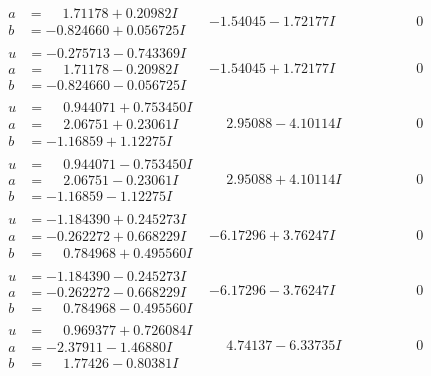 \documentclass[1p]{elsarticle_modified}
\theoremstyle{definition}
\begin{document}
$$\begin{array}{c|c|c}
\begin{aligned}
a &= \phantom{-}1.71178 + 0.20982 I \\
b &= -0.824660 + 0.056725 I\end{aligned}
 & -1.54045 - 1.72177 I & \phantom{-0.000000 } 0 \\ \hline\begin{aligned}
u &= -0.275713 - 0.743369 I \\
a &= \phantom{-}1.71178 - 0.20982 I \\
b &= -0.824660 - 0.056725 I\end{aligned}
 & -1.54045 + 1.72177 I & \phantom{-0.000000 } 0 \\ \hline\begin{aligned}
u &= \phantom{-}0.944071 + 0.753450 I \\
a &= \phantom{-}2.06751 + 0.23061 I \\
b &= -1.16859 + 1.12275 I\end{aligned}
 & \phantom{-}2.95088 - 4.10114 I & \phantom{-0.000000 } 0 \\ \hline\begin{aligned}
u &= \phantom{-}0.944071 - 0.753450 I \\
a &= \phantom{-}2.06751 - 0.23061 I \\
b &= -1.16859 - 1.12275 I\end{aligned}
 & \phantom{-}2.95088 + 4.10114 I & \phantom{-0.000000 } 0 \\ \hline\begin{aligned}
u &= -1.184390 + 0.245273 I \\
a &= -0.262272 + 0.668229 I \\
b &= \phantom{-}0.784968 + 0.495560 I\end{aligned}
 & -6.17296 + 3.76247 I & \phantom{-0.000000 } 0 \\ \hline\begin{aligned}
u &= -1.184390 - 0.245273 I \\
a &= -0.262272 - 0.668229 I \\
b &= \phantom{-}0.784968 - 0.495560 I\end{aligned}
 & -6.17296 - 3.76247 I & \phantom{-0.000000 } 0 \\ \hline\begin{aligned}
u &= \phantom{-}0.969377 + 0.726084 I \\
a &= -2.37911 - 1.46880 I \\
b &= \phantom{-}1.77426 - 0.80381 I\end{aligned}
 & \phantom{-}4.74137 - 6.33735 I & \phantom{-0.000000 } 0 \\ \hline\begin{aligned}

\end{aligned}
\end{array}$$
\end{document}
